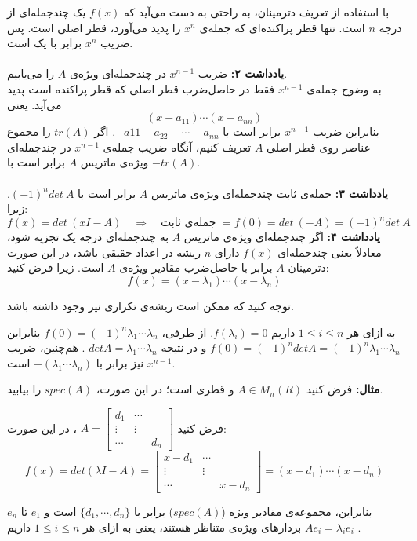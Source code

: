	با استفاده از تعریف دترمینان، به راحتی به دست می‌آید که $f(x)$ یک چند‌جمله‌ای از درجه $n$ است. تنها قطر پراکنده‌ای که جمله‌ی $x^n$ را پدید می‌آورد، قطر اصلی است. پس ضریب $x^n$ برابر با یک است.\\\\
	\textbf{یادداشت ۲:} ضریب $x^{n-1}$ در چند‌جمله‌ای ویژه‌ی $A$ را می‌یابیم.\\
	به وضوح جمله‌ی $x^{n-1}$ فقط در حاصل‌ضرب قطر اصلی که قطر پراکنده است پدید می‌آید. یعنی
	$$(x-a_{11})\cdots(x- a_{nn})$$
	بنابراین ضریب $x^{n-1}$ برابر است با $-a{11}-a_{22}-\cdots-a_{nn}$. اگر $tr(A)$ را مجموع عناصر روی قطر اصلی $A$ تعریف کنیم، آنگاه ضریب جمله‌ی $x^{n-1}$ در چند‌جمله‌ای ویژه‌ی ماتریس $A$ برابر است با $-tr(A)$.\\\\
	\textbf{یادداشت ۳:}
	جمله‌ی ثابت چند‌جمله‌ای ویژه‌ی ماتریس $A$ برابر است با $(-1)^n det\:A$. زیرا:
	$$f(x) = det\: (xI - A) \quad \Rightarrow \quad \text{جمله‌ی ثابت }= f(0) = det\:(-A) = (-1)^ndet\:A$$
	\textbf{یادداشت ۴:} اگر چند‌جمله‌ای ویژه‌ی ماتریس $A$ به چند‌جمله‌ای درجه یک تجزیه شود، معادلاً یعنی چند‌جمله‌ای $f(x)$ دارای $n$ ریشه در اعداد حقیقی باشد، در این صورت دترمینان $A$ برابر با حاصل‌ضرب مقادیر ویژه‌ی $A$ است. زیرا فرض کنید:
	$$f(x) = (x - \lambda_1)\cdots(x - \lambda_n)$$

توجه کنید که ممکن است ریشه‌ی تکراری نیز وجود داشته باشد.

به ازای هر $1 \leq i \leq n$ داریم $f(\lambda_i)=0$. از طرفی،
$f(0)=(-1)^n \lambda_1 \cdots \lambda_n $
بنابراین
$f(0) = (-1)^n det A = (-1)^n \lambda_1 \cdots \lambda_n $
و در نتیجه
$det A = \lambda_1 \cdots \lambda_n $
. هم‌چنین، ضریب $x^{n-1}$ نیز برابر با
$-(\lambda_1 \cdots \lambda_n) $
است.

\textbf{مثال:}
فرض کنید $A \in M_n(R)$ و قطری است؛ در این صورت، $spec(A)$ را بیابید.

فرض کنید
$A=\begin{bmatrix}
d_1 & \cdots \\
\vdots & \vdots \\
\cdots && d_n
\end{bmatrix} $
، در این صورت:
$$f(x)=det(\lambda I - A)=\begin{bmatrix}
x-d_1 & \cdots \\
\vdots & \vdots \\
\cdots && x-d_n
\end{bmatrix} = (x-d_1) \cdots (x-d_n) $$

بنابراین، مجموعه‌ی مقادیر ویژه ($spec(A)$) برابر با
$\{d_1,\cdots,d_n\}$
است و $e_1$ تا $e_n$ بردارهای ویژه‌ی متناظر هستند، یعنی به ازای هر $1\leq i \leq n$ داریم
$Ae_i = \lambda_i e_i $
.

